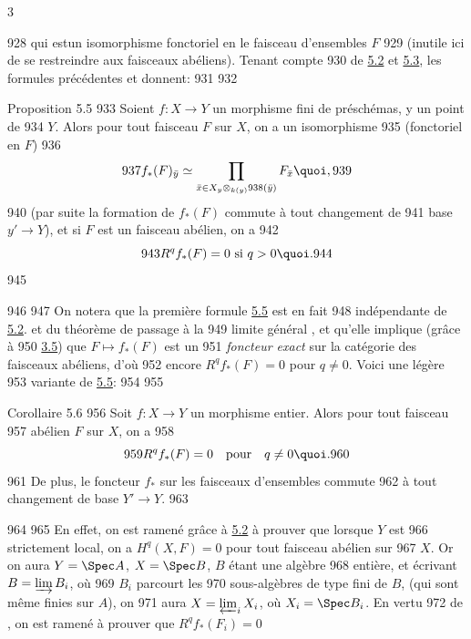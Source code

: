 3	\documentclass[10pt]{../fichiers-configuration-latex/smfart}
\begin{document}
   928	qui est\pageoriginale un isomorphisme fonctoriel en le faisceau d'ensembles $F$
   929	(inutile ici de se restreindre aux faisceaux abéliens). Tenant compte
   930	de \hyperref[VIII.thm5.2]{5.2} et \hyperref[VIII.rem5.3]{5.3}, les formules précédentes  et  donnent:
   931	
   932	\begin{enonce*}{Proposition 5.5}
   933	Soient $f : X \to Y$ un morphisme fini de préschémas, y un point de
   934	$Y$. Alors pour tout faisceau $F$ sur $X$, on a un isomorphisme
   935	(fonctoriel en $F$)
   936	$$
   937	f_{\ast} (F)_{\bar{y}} \simeq \prod_{\bar{x} \in X_{y}\otimes_{k(y)}
   938	(\bar{y})} F_{\bar{x}}{\quoi},
   939	$$
   940	(par suite la formation de $f_{\ast} (F)$ commute à tout changement de
   941	base $y'\to Y$), et si $F$ est un faisceau abélien, on a
   942	$$
   943	R^q f_{\ast} (F) = 0 \mbox{ si } q > 0{\quoi}.
   944	$$
   945	\end{enonce*}
   946	
   947	On notera que la première formule \hyperref[VIII.prop5.5]{5.5} est en fait
   948	indépendante de \hyperref[VIII.thm5.2]{5.2}. et du théorème de passage à la
   949	limite général , et qu'elle implique (grâce à
   950	\hyperref[VIII.thm3.5]{3.5}) que $F \mapsto f_{\ast} (F)$ est un
   951	\emph{foncteur exact} sur la catégorie des faisceaux abéliens, d'où
   952	encore $R^q f_{\ast} (F) = 0$ pour $q \neq 0$. Voici une légère
   953	variante de \hyperref[VIII.prop5.5]{5.5}:
   954	
   955	\begin{enonce*}{Corollaire 5.6}
   956	Soit $f : X \to Y$ un morphisme entier. Alors pour tout faisceau
   957	abélien $F$ sur $X$, on a
   958	$$
   959	R^q f_{\ast} (F) = 0\quad \mbox{pour}\quad q \neq 0{\quoi}.
   960	$$
   961	De plus, le foncteur $f_{\ast}$ sur les faisceaux d'ensembles commute
   962	à tout changement de base $Y'\to Y$.
   963	\end{enonce*}
   964	
   965	En effet, on est ramené grâce à \hyperref[VIII.thm5.2]{5.2} à prouver que lorsque $Y$ est
   966	strictement local, on a $H^q(X, F) = 0$ pour tout faisceau abélien sur
   967	$X$. Or on aura $Y = \Spec A$, $X = \Spec B$, $B$ étant une algèbre
   968	entière, et écrivant\pageoriginale $B = \varinjlim B_i$, où
   969	$B_i$ parcourt les
   970	sous-algèbres de type fini de $B$, (qui sont même finies sur $A$), on
   971	aura $X = \varprojlim_{i} X_i$, où $X_i = \Spec B_i$. En vertu
   972	de , on est ramené à prouver que $R^{q} f_{\ast} (F_i) = 0$
\end{document}
